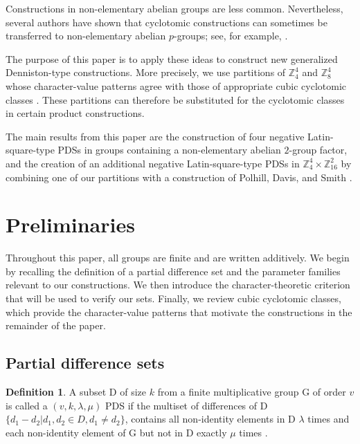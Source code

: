 \documentclass[11pt]{article}
\theoremstyle{definition}
\newtheorem{definition}[theorem]{Definition}
\theoremstyle{remark}
\newcommand{\Z}{\mathbb{Z}}
\begin{document}
Constructions in non-elementary abelian groups are less common.
Nevertheless, several authors have shown that cyclotomic constructions
can sometimes be transferred to non-elementary abelian \(p\)-groups;
see, for example,
\cite{davisxiang2000,polhill2008generalizations,polhill2009,
polhillDavisSmith2013}.

The purpose of this paper is to apply these ideas to construct new  generalized
Denniston-type constructions. More precisely, we use partitions of
\(\Z_4^4\) and \(\Z_8^4\) whose character-value patterns agree with
those of appropriate cubic cyclotomic classes \cite{private}. These partitions can
therefore be substituted for the cyclotomic classes in certain product
constructions.

The main results from this paper are the construction of four negative Latin-square-type PDSs in groups containing a non-elementary abelian \(2\)-group factor, and the creation of an additional negative Latin-square-type PDSs in \(\Z_4^4\times\Z_{16}^2\) by combining one of our partitions with a construction of Polhill, Davis, and Smith \cite{polhillDavisSmith2013}.






\section{Preliminaries}
\label{sec:preliminaries}

Throughout this paper, all groups are finite and are written
additively. We begin by recalling the definition of a partial
difference set and the parameter families relevant to our
constructions. We then introduce the character-theoretic criterion
that will be used to verify our sets. Finally, we review cubic
cyclotomic classes, which provide the character-value patterns that
motivate the constructions in the remainder of the paper.


\subsection{Partial difference sets}

\begin{definition}
A subset D of size $k$ from a finite multiplicative group G of order $v$ is called a $(v,k,\lambda,\mu)$ PDS  if the multiset of differences of D $\{ d_1-d_2 | d_1,d_2 \in D, d_1 \neq d_2 \}$, contains all non-identity elements in D $\lambda$ times and each non-identity element of G but not in D exactly $\mu$ times \cite{MaSurvey}.
\end{definition}
\end{document}

